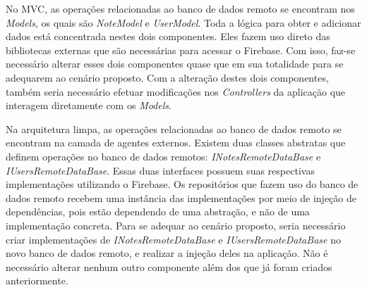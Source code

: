 No MVC, as operações relacionadas ao banco de dados remoto se encontram nos \emph{Models}, os quais são \emph{NoteModel} e \emph{UserModel}.
Toda a lógica para obter e adicionar dados está concentrada nestes dois componentes.
Eles fazem uso direto das bibliotecas externas que são necessárias para acessar o Firebase.
Com isso, faz-se necessário alterar esses dois componentes quase que em sua totalidade para se adequarem ao cenário proposto.
Com a alteração destes dois componentes, também seria necessário efetuar modificações nos \emph{Controllers} da aplicação que interagem diretamente com os \emph{Models}.

Na arquitetura limpa, as operações relacionadas ao banco de dados remoto se encontram na camada de agentes externos.
Existem duas classes abstratas que definem operações no banco de dados remotos: \emph{INotesRemoteDataBase} e \emph{IUsersRemoteDataBase}.
Essas duas interfaces possuem suas respectivas implementações utilizando o Firebase.
Os repositórios que fazem uso do banco de dados remoto recebem uma instância das implementações por meio de injeção de dependências, pois estão dependendo de uma abstração, e não de uma implementação concreta.
Para se adequar ao cenário proposto, seria necessário criar implementações de \emph{INotesRemoteDataBase} e \emph{IUsersRemoteDataBase} no novo banco de dados remoto, e realizar a injeção deles na aplicação.
Não é necessário alterar nenhum outro componente além dos que já foram criados anteriormente.